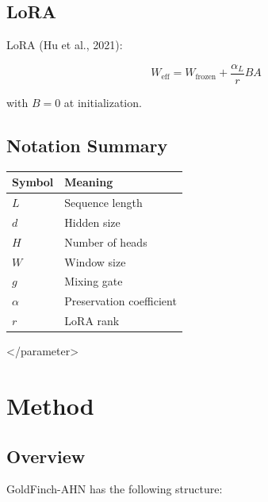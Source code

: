 \subsection{LoRA}

LoRA (Hu et al., 2021):

\[
W_\text{eff} = W_\text{frozen} + \frac{\alpha_L}{r} BA
\tag{3.6}
\]

with $B = 0$ at initialization.

\subsection{Notation Summary}

\begin{table}[H]
\centering
\small
\begin{tabular}{ll}
\toprule
\textbf{Symbol} & \textbf{Meaning} \\
\midrule
$L$ & Sequence length \\
$d$ & Hidden size \\
$H$ & Number of heads \\
$W$ & Window size \\
$g$ & Mixing gate \\
$\alpha$ & Preservation coefficient \\
$r$ & LoRA rank \\
\bottomrule
\end{tabular}
\end{table}
</parameter>




\section{Method}

\subsection{Overview}

GoldFinch-AHN has the following structure:

